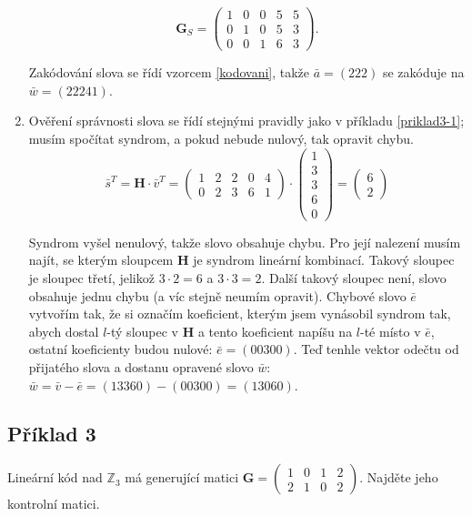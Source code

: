 \documentclass{article}
\begin{document}
\begin{enumerate}
    \[\mathbf{G}_S = \begin{pmatrix}
    1 & 0 & 0 & 5 & 5 \\
    0 & 1 & 0 & 5 & 3 \\
    0 & 0 & 1 & 6	& 3
    \end{pmatrix}.
	 \]
	
	Zakódování slova se řídí vzorcem \ref{kodovani}, takže $\bar{a} = (222)$ se zakóduje na $\bar{w} = (22241)$.
	
	\item Ověření správnosti slova se řídí stejnými pravidly jako v příkladu \ref{priklad3-1}; musím spočítat syndrom, a pokud nebude nulový, tak opravit chybu. 
	\[ \bar{s}^T = \mathbf{H}\cdot\bar{v}^T = 
	\begin{pmatrix}
		1 & 2 & 2 & 0 & 4 \\
	  0 & 2 & 3 & 6 & 1
	\end{pmatrix}\cdot
	\begin{pmatrix}
		1\\
	  3\\
	  3\\
	  6\\
	  0
	\end{pmatrix} =  
	\begin{pmatrix}
		6\\
	  2
	\end{pmatrix} \]
	
	Syndrom vyšel nenulový, takže slovo obsahuje chybu. Pro její nalezení musím najít, se kterým sloupcem $\mathbf{H}$ je syndrom lineární kombinací. Takový sloupec je sloupec třetí, jelikož $3\cdot2 = 6$ a $3\cdot3 = 2$. Další takový sloupec není, slovo obsahuje jednu chybu (a víc stejně neumím opravit). Chybové slovo $\bar{e}$ vytvořím tak, že si označím koeficient, kterým jsem vynásobil syndrom tak, abych dostal $l$-tý sloupec v $\mathbf{H}$ a tento koeficient napíšu na $l$-té místo v $\bar{e}$, ostatní koeficienty budou nulové: $\bar{e} = (00300)$. Teď tenhle vektor odečtu od přijatého slova a dostanu opravené slovo $\bar{w}$: $\bar{w} = \bar{v} - \bar{e} = (13360) - (00300) = (13060)$.
	
\end{enumerate}

\subsection{Příklad 3}
Lineární kód nad $\mathbb{Z}_3$ má generující matici $\mathbf{G} = 
\begin{pmatrix}
  1 & 0 & 1 & 2 \\
  2 & 1 & 0 & 2
\end{pmatrix}$. Najděte jeho kontrolní matici.
\end{document}
